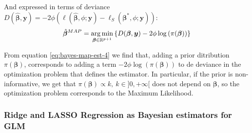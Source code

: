 \documentclass[a4paper, nobind]{templates/ociamthesis}
\theoremstyle{definition}
\theoremstyle{definition}
\theoremstyle{definition}
\theoremstyle{remark}
\begin{document}
And expressed in terms of deviance \(D(\hat{\boldsymbol{\beta}}, \boldsymbol{y}) = -2\phi\left(\ell\left(\hat{\boldsymbol{\beta}}, \phi; \boldsymbol{y}\right) - \ell_{S}\left(\boldsymbol{\beta}^*, \phi; \boldsymbol{y}\right)\right)\):
\begin{equation}
\label{eq:bayes-map-est-4}
\hat{\boldsymbol{\beta}}^{MAP} =
\operatorname*{arg\,min}_{\boldsymbol{\beta}\in\mathbb{R}^{p+1}}{\left\{
D(\boldsymbol{\beta}, \boldsymbol{y}) -2\phi \log{\left(\pi(\boldsymbol{\beta})\right)} \right\}}
\end{equation}

From equation \eqref{eq:bayes-map-est-4} we find that, adding a prior ditribution \(\pi(\boldsymbol{\beta})\), corresponds to adding a term \(-2\phi \log{\left(\pi(\boldsymbol{\beta})\right)}\) to de deviance in the optimization problem that defines the estimator. In particular, if the prior is non-informative, we get that \(\pi(\boldsymbol{\beta})\propto k, \ k\in]0,+\infty[\) does not depend on \(\boldsymbol{\beta}\), so the optimization problem corresponds to the Maximum Likelihood.

\hypertarget{chap:bayes-ridge-lasso}{%
\subsubsection{Ridge and LASSO Regression as Bayesian estimators for GLM}\label{chap:bayes-ridge-lasso}}
\end{document}
